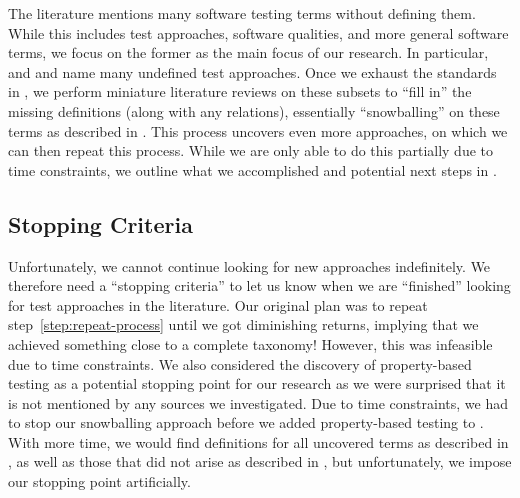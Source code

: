 The literature mentions many software testing terms without defining them.
While this includes test approaches, software qualities, and more general
software terms, we focus on the former as the main focus of our research.
In particular, \ifnotpaper \citet{IEEE2022} and \citet{Firesmith2015} \else
    \cite{Firesmith2015} and \cite{IEEE2022} \fi name many undefined test
approaches. Once we exhaust the standards in , we
perform miniature literature reviews on these subsets to ``fill in'' the
missing definitions (along with any relations), essentially ``snowballing''
on these terms as described in . This process uncovers
even more approaches, on which we can then repeat this process. \ifnotpaper
    While we are only able to do this partially due to time constraints, we
    outline what we accomplished and potential next steps in
    . \fi

\subsection{Stopping Criteria}\label{stop-crit}

Unfortunately, we cannot continue looking for new approaches indefinitely. We
therefore need a ``stopping criteria'' to let us know when we are ``finished''
looking for test approaches in the literature. Our original plan was to repeat
step~\ref{step:repeat-process} until we got diminishing returns, implying that
we achieved something close to a complete taxonomy! However, this was infeasible
due to time constraints. We also considered the discovery of property-based testing
as a potential stopping point for our research%
 as we
were surprised that it is not mentioned by any sources we investigated. Due to
time constraints, we had to stop our snowballing approach before we added
property-based testing to \ourApproachGlossary{}. With more time, we would find
definitions for all uncovered terms as described in ,
\ifnotpaper as well as those that did not arise as described in
    , \fi but unfortunately, we impose our stopping
point artificially.
